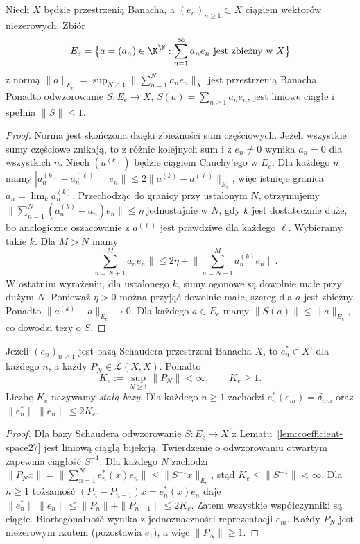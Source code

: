 \begin{lemat}
\label{lem:coefficient-space27}
Niech $X$ będzie przestrzenią Banacha, a $(e_n)_{n\ge1}\subset X$
ciągiem wektorów niezerowych. Zbiór
\[
E_e=\bigl\{a=(a_n)\in\K^{\N}:\sum_{n=1}^{\infty}a_ne_n
\text{ jest zbieżny w }X\bigr\}
\]
z normą $\|a\|_{E_e}=\sup_{N\ge1}\|\sum_{n=1}^Na_ne_n\|_X$
jest przestrzenią Banacha. Ponadto odwzorowanie
$S:E_e\to X$, $S(a)=\sum_{n\ge1}a_ne_n$, jest liniowe
ciągłe i spełnia $\|S\|\le1$.
\end{lemat}
\begin{proof}
Norma jest skończona dzięki zbieżności sum częściowych.
Jeżeli wszystkie sumy częściowe znikają, to z różnic kolejnych
sum i z $e_n\ne0$ wynika $a_n=0$ dla wszystkich $n$.
Niech $(a^{(k)})$ będzie ciągiem Cauchy'ego w $E_e$.
Dla każdego $n$ mamy
$|a_n^{(k)}-a_n^{(\ell)}|\,\|e_n\|
\le2\|a^{(k)}-a^{(\ell)}\|_{E_e}$,
więc istnieje granica $a_n=\lim_k a_n^{(k)}$.
Przechodząc do granicy przy ustalonym $N$, otrzymujemy
$\|\sum_{n=1}^N(a_n^{(k)}-a_n)e_n\|\le\eta$
jednostajnie w $N$, gdy $k$ jest dostatecznie duże,
bo analogiczne oszacowanie z $a^{(\ell)}$ jest
prawdziwe dla każdego $\ell$.
Wybieramy takie $k$. Dla $M>N$ mamy
\[
\Big\|\sum_{n=N+1}^Ma_ne_n\Big\|
\le2\eta+\Big\|\sum_{n=N+1}^Ma_n^{(k)}e_n\Big\|.
\]
W ostatnim wyrażeniu, dla ustalonego $k$, sumy ogonowe
są dowolnie małe przy dużym $N$. Ponieważ $\eta>0$
można przyjąć dowolnie małe, szereg dla $a$ jest zbieżny.
Ponadto $\|a^{(k)}-a\|_{E_e}\to0$.
Dla każdego $a\in E_e$ mamy
$\|S(a)\|\le\|a\|_{E_e}$, co dowodzi tezy o $S$.
\end{proof}

\begin{twierdzenie}
\label{thm:basis-continuity27}
Jeżeli $(e_n)_{n\ge1}$ jest bazą Schaudera przestrzeni
Banacha $X$, to $e_n^*\in X'$ dla każdego $n$, a każdy
$P_N\in\mathcal L(X,X)$. Ponadto
\[
K_e:=\sup_{N\ge1}\|P_N\|<\infty,\qquad K_e\ge1.
\]
Liczbę $K_e$ nazywamy \emph{stałą bazy}.
Dla każdego $n\ge1$ zachodzi $e_n^*(e_m)=\delta_{nm}$
oraz $\|e_n^*\|\,\|e_n\|\le2K_e$.
\end{twierdzenie}
\begin{proof}
Dla bazy Schaudera odwzorowanie $S:E_e\to X$
z Lematu~\ref{lem:coefficient-space27} jest liniową ciągłą
bijekcją. Twierdzenie o odwzorowaniu otwartym zapewnia
ciągłość $S^{-1}$. Dla każdego $N$ zachodzi
$\|P_Nx\|=\|\sum_{n=1}^Ne_n^*(x)e_n\|
\le\|S^{-1}x\|_{E_e}$,
stąd $K_e\le\|S^{-1}\|<\infty$.
Dla $n\ge1$ tożsamość
$(P_n-P_{n-1})x=e_n^*(x)e_n$
daje $\|e_n^*\|\,\|e_n\|\le\|P_n\|+\|P_{n-1}\|
\le2K_e$. Zatem wszystkie współczynniki są ciągłe.
Biortogonalność wynika z jednoznaczności reprezentacji $e_m$.
Każdy $P_N$ jest niezerowym rzutem (pozostawia $e_1$),
a więc $\|P_N\|\ge1$.
\end{proof}

